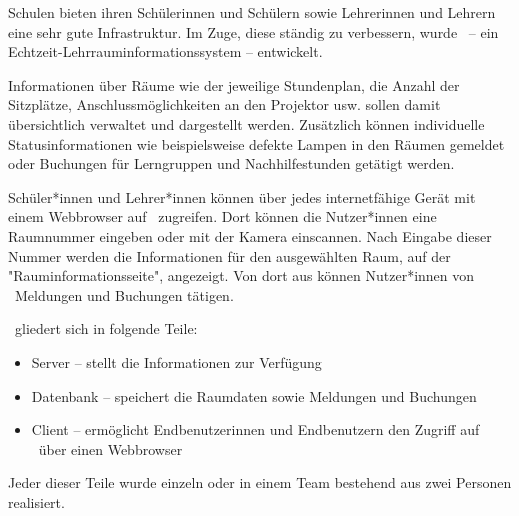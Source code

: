 
Schulen bieten ihren Schülerinnen und Schülern sowie Lehrerinnen und Lehrern eine sehr gute Infrastruktur. 
Im Zuge, diese ständig zu verbessern, wurde \ZELIA\ -- ein Echtzeit-Lehr\-raum\-informations\-system -- entwickelt. 

Informationen über Räume wie der jeweilige Stundenplan, die Anzahl der Sitzplätze, Anschlussmöglichkeiten an den Projektor usw. sollen damit übersichtlich verwaltet und dargestellt werden.
Zusätzlich können individuelle Statusinformationen wie beispielsweise defekte Lampen in den Räumen gemeldet oder Buchungen für Lerngruppen und Nachhilfestunden getätigt werden.

Schüler*innen und Lehrer*innen können über jedes internetfähige Gerät mit einem Webbrowser auf \ZELIA\ zugreifen. 
Dort können die Nutzer*innen eine Raumnummer eingeben oder mit der Kamera einscannen. 
Nach Eingabe dieser Nummer werden die Informationen für den ausgewählten Raum, auf der "Rauminformationsseite", angezeigt. 
Von dort aus können Nutzer*innen von \ZELIA\ Meldungen und Buchungen tätigen.

\ZELIA\ gliedert sich in folgende Teile:
\begin{itemize}
    \item Server -- stellt die Informationen zur Verfügung
    \item Datenbank -- speichert die Raumdaten sowie Meldungen und Buchungen
    \item Client -- ermöglicht Endbenutzerinnen und Endbenutzern den Zugriff auf \ZELIA\ über einen Webbrowser
\end{itemize}

Jeder dieser Teile wurde einzeln oder in einem Team bestehend aus zwei Personen realisiert.
